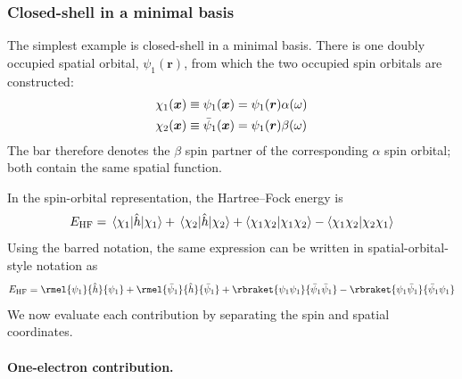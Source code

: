 \documentclass[11pt,a4paper,titlepage]{article}
\numberwithin{equation}{section}
\newcommand{\EHF}{E_\text{HF}}
\newcommand{\br}{\boldsymbol{r}}
\newcommand{\bx}{\boldsymbol{x}}
\newcommand{\hh}{\Hat{h}}
\begin{document}

\subsubsection{Closed-shell  in a minimal basis}

The simplest example is closed-shell  in a minimal basis. There is
one doubly occupied spatial orbital, $\psi_1(\br)$, from which the two
occupied spin orbitals are constructed:
\begin{equation}
\begin{split}
  \chi_1(\bx)
  &\equiv
  \psi_1(\bx)
  =
  \psi_1(\br)\alpha(\omega)
  \\
  \chi_2(\bx)
  &\equiv
  \Bar{\psi}_1(\bx)
  =
  \psi_1(\br)\beta(\omega)
  \label{eq:h2-spin-orbitals}
\end{split}
\end{equation}
The bar therefore denotes the $\beta$ spin partner of the corresponding
$\alpha$ spin orbital; both contain the same spatial function.

In the spin-orbital representation, the Hartree--Fock energy is
\begin{equation}
  \EHF
  =
  \mel{\chi_1}{\hh}{\chi_1}
  +
  \mel{\chi_2}{\hh}{\chi_2}
  +
  \braket{\chi_1\chi_2}{\chi_1\chi_2}
  -
  \braket{\chi_1\chi_2}{\chi_2\chi_1}
  \label{eq:h2-spin-orbital-energy}
\end{equation}
Using the barred notation, the same expression can be written in
spatial-orbital-style notation as
\begin{equation}
  \EHF
  =
  \rmel{\psi_1}{\hh}{\psi_1}
  +
  \rmel{\Bar{\psi}_1}{\hh}{\Bar{\psi}_1}
  +
  \rbraket{\psi_1\psi_1}{\Bar{\psi}_1\Bar{\psi}_1}
  -
  \rbraket{\psi_1\Bar{\psi}_1}{\Bar{\psi}_1\psi_1}
\end{equation}
We now evaluate each contribution by separating the spin and spatial
coordinates.

\paragraph{One-electron contribution.}
\end{document}
